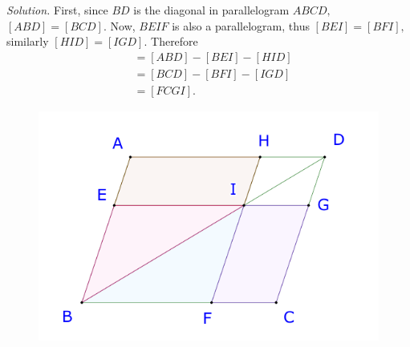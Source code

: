 \begin{multicols}{2}
\begin{figure}[H]
		\vspace*{-10pt}
	\end{figure}
	\textit{Solution.}
	First, since $BD$ is the diagonal in parallelogram $ABCD,$ $[ABD] = [BCD].$
	Now, $BEIF$ is also a parallelogram, thus $[BEI] = [BFI],$ similarly $[HID] = [IGD].$
	Therefore 
	\begin{align*}
		[AEIH] &= [ABD] - [BEI] - [HID] \\
		&= [BCD] - [BFI] - [IGD] \\
		&= [FCGI].
	\end{align*}
	\begin{figure}[H]
		\vspace*{-5pt}
		\centering
		\captionsetup{labelformat= empty, justification=centering}
		\includegraphics[width= 1\linewidth]{23-24-s3-i-p3-s.pdf}
		\vspace*{-10pt}
	\end{figure}
	\begin{figure}[H]
		\vspace*{-5pt}
		\centering
		\captionsetup{labelformat= empty, justification=centering}

\end{figure}
\end{multicols}
